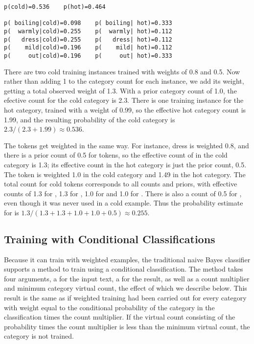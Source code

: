 \begin{verbatim}
p(cold)=0.536    p(hot)=0.464

p( boiling|cold)=0.098    p( boiling| hot)=0.333
p(  warmly|cold)=0.255    p(  warmly| hot)=0.112
p(   dress|cold)=0.255    p(   dress| hot)=0.112
p(    mild|cold)=0.196    p(    mild| hot)=0.112
p(     out|cold)=0.196    p(     out| hot)=0.333
\end{verbatim}
%
There are two cold training instances trained with weights of 0.8 and
0.5.  Now rather than adding 1 to the category count for each
instance, we add its weight, getting a total observed weight of 1.3.
With a prior category count of 1.0, the efective count for the cold
category is 2.3.  There is one training instance for the hot category,
trained with a weight of 0.99, so the effective hot category count is
1.99, and the resulting probability of the cold category is
$2.3/(2.3+1.99) \approx 0.536$.

The tokens get weighted in the same way.  For instance, dress is
weighted 0.8, and there is a prior count of 0.5 for tokens, so the
effective count of  in the cold category is 1.3;
its effective count in the hot category is just the prior count, 0.5.
The token  is weighted 1.0 in the cold category and
1.49 in the hot category.  The total count for cold tokens corresponds
to all counts and priors, with effective counts of 1.3 for
, 1.3 for , 1.0 for
 and 1.0 for .  There is also
a count of 0.5 for , even though it was never
used in a cold example.  Thus the probability estimate for
 is $1.3/(1.3 + 1.3 + 1.0 + 1.0 + 0.5) \approx
0.255$.

\subsection{Training with Conditional Classifications}

Because it can train with weighted examples, the traditional naive
Bayes classifier supports a method to train using a conditional
classification.  The method  takes four
arguments, a  for the input text, a
 for the result, as well as a count
multiplier and minimum category virtual count, the effect of which we
describe below. This result is the same as if weighted training had
been carried out for every category with weight equal to the
conditional probability of the category in the classification times
the count multiplier.  If the virtual count consisting of the
probability times the count multiplier is less than the minimum
virtual count, the category is not trained.



